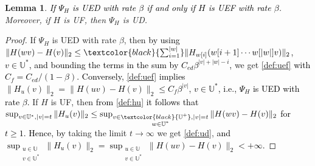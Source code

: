 \documentclass[journal,twoside,web]{ieeecolor}
\newtheorem{Lemma}[Theorem]{Lemma}
\begin{document}
  \begin{Lemma}
      \label{UD:UF}
      \textcolor{black}{If $\Psi_H$ is UED with rate $\beta$ if and only if $H$ is  UEF with rate $\beta$}. Moreover, if $H$ is UF, then $\Psi_H$ is UD.
      \end{Lemma}
    \begin{proof}
             If $\Psi_H$ is UED with rate $\beta$, then 
             \textcolor{black}{by using
             \( \|H(wv)-H(v)\|_2 \le  \textcolor{black}{\sum_{i=1}^{|w|}} \|H_{w[i]}(w[i+1] \cdots w[|w|]v)\|_2 \), 
             \textcolor{black}{$v \in \mathbb{U}^{*}$}, 
             and
              bounding the terms in the sum by $C_{ed}\beta^{|v|+|w|-i}$,}
             we get 
             \eqref{def:uef} \textcolor{black}{with $C_f=C_{ed}/(1-\beta)$. 
             Conversely, \eqref{def:uef} implies $\|H_{u}(v)\|_2=\|H(uv)-H(v)\|_2 \le C_f\beta^{|v|}$, $v \in \mathbb{U}^{*}$, i.e., $\Psi_H$ is UED with rate $\beta$.}
            If $H$ is UF, then
            \textcolor{black}{from \eqref{def:hu} it follows that}
            $\sup_{v \in \mathbb{U}^{*}, |v|=t} \|H_u(v)\|_2 \le
            \sup_{\substack{v \in \textcolor{black}{\mathbb{U}^{+}}, |v|=t \\ w \in \mathbb{U}^{*}}}
                \|H(wv)-H(v)\|_2$
                \textcolor{black}{for $t \ge 1$. Hence,}
                \textcolor{black}{by} taking the limit $t \rightarrow \infty$ we get \eqref{def:ud}, \textcolor{black}{and 
                 $\sup_{\substack{u \in \mathbb{U} \\ v \in \mathbb{U}^{*}}} \|H_u(v)\|_2\!=\! \sup_{\substack{u \in \mathbb{U} \\ v \in \mathbb{U}^{*}}}\! \! \|H(uv)-H(v)\|_2<+\infty$.}
    \end{proof}
\end{document}
